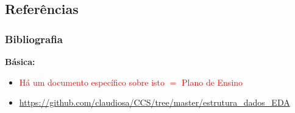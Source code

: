 
\subsection{Referências}  

\begin{frame}[allowframebreaks=0.9]
\frametitle{Bibliografia}  

\textbf{Básica:} 
\begin{itemize}

\item   \textcolor{red}{Há um documento específico sobre isto $=$ Plano de Ensino}


\item \url{https://github.com/claudiosa/CCS/tree/master/estrutura_dados_EDA}

\end{itemize}



\end{frame}




